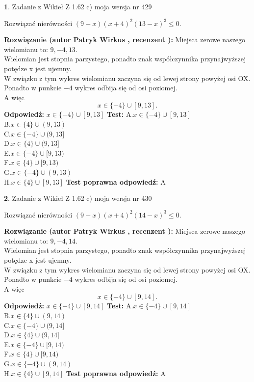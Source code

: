 \documentclass[12pt, a4paper]{article}
\theoremstyle{definition} %
\newtheorem{zad}{}
\newcommand{\zadStart}[1]{\begin{zad}#1\newline}
\newcommand{\zadStop}{\end{zad}}
\newcommand{\rozwStart}[2]{\noindent \textbf{Rozwiązanie (autor #1 , recenzent #2): }\newline}
\newcommand{\rozwStop}{\newline}
\newcommand{\odpStart}{\noindent \textbf{Odpowiedź:}\newline}
\newcommand{\odpStop}{\newline}
\newcommand{\testStart}{\noindent \textbf{Test:}\newline}
\newcommand{\testStop}{\newline}
\newcommand{\kluczStart}{\noindent \textbf{Test poprawna odpowiedź:}\newline}
\newcommand{\kluczStop}{\newline}
\begin{document}
\zadStart{Zadanie z Wikieł Z 1.62 c) moja wersja nr 429}

Rozwiązać nierówności $(9-x)(x+4)^{2}(13-x)^{3}\le0$.
\zadStop
\rozwStart{Patryk Wirkus}{}
Miejsca zerowe naszego wielomianu to: $9, -4, 13$.\\
Wielomian jest stopnia parzystego, ponadto znak współczynnika przy\linebreak najwyższej potędze x jest ujemny.\\ W związku z tym wykres wielomianu zaczyna się od lewej strony powyżej osi OX.\\
Ponadto w punkcie $-4$ wykres odbija się od osi poziomej.\\
A więc $$x \in \{-4\} \cup [9,13].$$
\rozwStop
\odpStart
$x \in \{-4\} \cup [9,13]$
\odpStop
\testStart
A.$x \in \{-4\} \cup [9,13]$\\
B.$x \in \{4\} \cup (9,13)$\\
C.$x \in \{-4\} \cup (9,13]$\\
D.$x \in \{4\} \cup (9,13]$\\
E.$x \in \{-4\} \cup [9,13)$\\
F.$x \in \{4\} \cup [9,13)$\\
G.$x \in \{-4\} \cup (9,13)$\\
H.$x \in \{4\} \cup [9,13]$
\testStop
\kluczStart
A
\kluczStop



\zadStart{Zadanie z Wikieł Z 1.62 c) moja wersja nr 430}

Rozwiązać nierówności $(9-x)(x+4)^{2}(14-x)^{3}\le0$.
\zadStop
\rozwStart{Patryk Wirkus}{}
Miejsca zerowe naszego wielomianu to: $9, -4, 14$.\\
Wielomian jest stopnia parzystego, ponadto znak współczynnika przy\linebreak najwyższej potędze x jest ujemny.\\ W związku z tym wykres wielomianu zaczyna się od lewej strony powyżej osi OX.\\
Ponadto w punkcie $-4$ wykres odbija się od osi poziomej.\\
A więc $$x \in \{-4\} \cup [9,14].$$
\rozwStop
\odpStart
$x \in \{-4\} \cup [9,14]$
\odpStop
\testStart
A.$x \in \{-4\} \cup [9,14]$\\
B.$x \in \{4\} \cup (9,14)$\\
C.$x \in \{-4\} \cup (9,14]$\\
D.$x \in \{4\} \cup (9,14]$\\
E.$x \in \{-4\} \cup [9,14)$\\
F.$x \in \{4\} \cup [9,14)$\\
G.$x \in \{-4\} \cup (9,14)$\\
H.$x \in \{4\} \cup [9,14]$
\testStop
\kluczStart
A
\kluczStop
\end{document}
